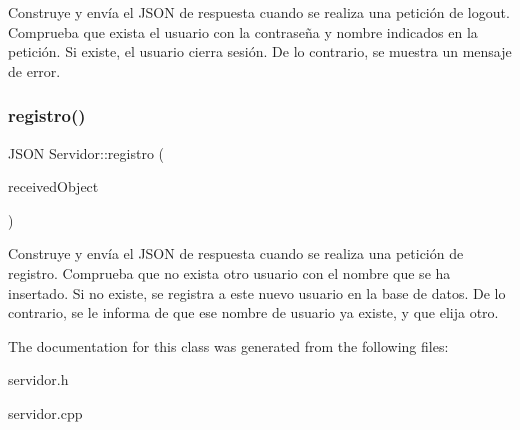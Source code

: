 Construye y envía el J\+S\+ON de respuesta cuando se realiza una petición de logout. Comprueba que exista el usuario con la contraseña y nombre indicados en la petición. Si existe, el usuario cierra sesión. De lo contrario, se muestra un mensaje de error. \mbox{\label{classServidor_adc19f6be9f624330db206a9d98c981a5}} 
\subsubsection{\texorpdfstring{registro()}{registro()}}
{\footnotesize\ttfamily J\+S\+ON Servidor\+::registro (\begin{DoxyParamCaption}\item[{J\+S\+ON}]{received\+Object }\end{DoxyParamCaption})}

Construye y envía el J\+S\+ON de respuesta cuando se realiza una petición de registro. Comprueba que no exista otro usuario con el nombre que se ha insertado. Si no existe, se registra a este nuevo usuario en la base de datos. De lo contrario, se le informa de que ese nombre de usuario ya existe, y que elija otro. 

The documentation for this class was generated from the following files\+:\begin{DoxyCompactItemize}
\item 
servidor.\+h\item 
servidor.\+cpp\end{DoxyCompactItemize}
